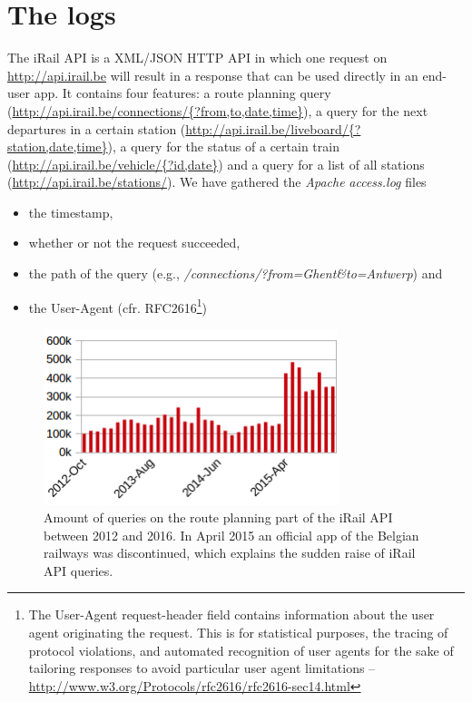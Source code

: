 \documentclass{sig-alternate}
\begin{document}
\section{The logs}
\label{sec:logs}

The iRail API is a XML/JSON HTTP API in which one request on \url{http://api.irail.be} will result in a response that can be used directly in an end-user app.
It contains four features: a route planning query (\url{http://api.irail.be/connections/{?from,to,date,time}}), a query for the next departures in a certain station (\url{http://api.irail.be/liveboard/{?station,date,time}}), a query for the status of a certain train (\url{http://api.irail.be/vehicle/{?id,date}}) and a query for a list of all stations (\url{http://api.irail.be/stations/}).
We have gathered the \emph{Apache} \emph{access.log} files 
\begin{itemize}
  \item the timestamp,
  \item whether or not the request succeeded,
  \item the path of the query (e.g., \emph{/connections/?from=Ghent\&to=Antwerp}) and
  \item the User-Agent (cfr. RFC2616\footnote{The User-Agent request-header field contains information about the user agent originating the request. This is for statistical purposes, the tracing of protocol violations, and automated recognition of user agents for the sake of tailoring responses to avoid particular user agent limitations -- \url{http://www.w3.org/Protocols/rfc2616/rfc2616-sec14.html}})
\end{itemize}

\begin{figure}
\centering
\includegraphics[width=8.6cm,align=center]{querylogs}
\caption{Amount of queries on the route planning part of the iRail API between 2012 and 2016. In April 2015 an official app of the Belgian railways was discontinued, which explains the sudden raise of iRail API queries.}
\label{fig:querylogs}
\end{figure}
\end{document}
